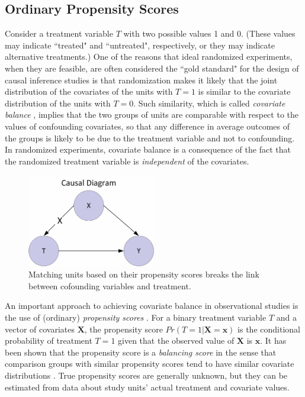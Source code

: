 \subsection{Ordinary Propensity Scores}\label{IIIB}
Consider a treatment variable $T$ with two possible values 1 and 0.  (These values may indicate ``treated" and ``untreated", respectively, or they may indicate alternative treatments.)  One of the reasons that ideal randomized experiments, when they are feasible, are often considered the ``gold standard" for the design of causal inference studies \cite{Grossman2005} is that randomization makes it likely that the joint distribution of the covariates of the units with $T=1$ is similar to the covariate distribution of the units with $T=0$.  Such similarity, which is called {\it covariate balance} \cite{Rosenbaum1983}, implies that the two groups of units are comparable with respect to the values of confounding covariates, so that any difference in average outcomes of the groups is likely to be due to the treatment variable and not to confounding.  In randomized experiments, covariate balance is a consequence of the fact that the randomized treatment variable is {\it independent} of the covariates.

\begin{figure}[!thpb]
\centering
\includegraphics[width=0.5\textwidth]{chapter3_causal_dag2.pdf}
\caption{Matching units based on their propensity scores breaks the link between cofounding variables and treatment.}
\label{dag2}
\end{figure}

An important approach to achieving covariate balance in observational studies is the use of (ordinary) {\it propensity scores} \cite{Rosenbaum1983}.  For a binary treatment variable $T$ and a vector of covariates $\pmb{X}$, the propensity score $Pr(T=1|\pmb{X}=\pmb{x})$ is the conditional probability of treatment $T=1$ given that the observed value of $\pmb{X}$ is $\pmb{x}$.  It has been shown that the propensity score is a {\it balancing score} in the sense that comparison groups with similar propensity scores tend to have similar covariate distributions \cite{Rosenbaum1983}.  True propensity scores are generally unknown, but they can be estimated from data about study units' actual treatment and covariate values.

